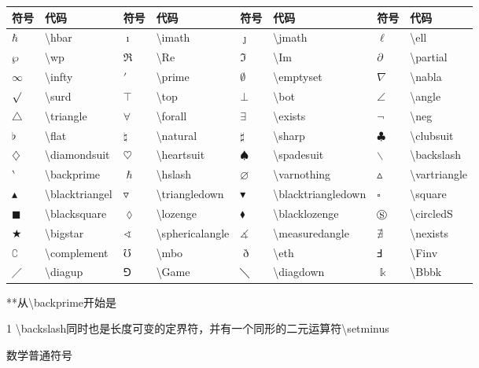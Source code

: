 \documentclass[UTF8,fontset=ubuntu]{ctexart}
\begin{document}
\begin{threeparttable}
\begin{tabular}{l l l l l l l l}
	\hline
	符号 & 代码 & 符号 & 代码 & 符号 & 代码 & 符号 & 代码\\
	\hline
	$\hbar$ & \textbackslash hbar & $\imath$ & \textbackslash imath & $\jmath$ & \textbackslash jmath & $\ell$ & \textbackslash ell\\
	$\wp$ & \textbackslash wp & $\Re$ & \textbackslash Re & $\Im$ & \textbackslash Im & $\partial$ & \textbackslash partial\\
	$\infty$ & \textbackslash infty & $\prime$ & \textbackslash prime & $\emptyset$ & \textbackslash emptyset & $\nabla$ & \textbackslash nabla\\
	$\surd$ & \textbackslash surd & $\top$ & \textbackslash top & $\bot$ & \textbackslash bot & $\angle$ & \textbackslash angle\\
	$\triangle$ & \textbackslash triangle & $\forall$ & \textbackslash forall & $\exists$ & \textbackslash exists & $\neg$ & \textbackslash neg\\
	$\flat$ & \textbackslash flat & $\natural$ & \textbackslash natural & $\sharp$ & \textbackslash sharp & $\clubsuit$ & \textbackslash clubsuit\\
	$\diamondsuit$ & \textbackslash diamondsuit & $\heartsuit$ & \textbackslash heartsuit & $\spadesuit$ & \textbackslash spadesuit & $\backslash$ & \textbackslash backslash\tnote{1}\\
	$\backprime$ & \textbackslash backprime & $\hslash$ & \textbackslash hslash & $\varnothing$ & \textbackslash varnothing & $\vartriangle$ & \textbackslash vartriangle\\
	$\blacktriangle$ & \textbackslash blacktriangel & $\triangledown$ & \textbackslash triangledown & $\blacktriangledown$ & \textbackslash blacktriangledown & $\square$ & \textbackslash square\\
	$\blacksquare$ & \textbackslash blacksquare & $\lozenge$ & \textbackslash lozenge & $\blacklozenge$ & \textbackslash blacklozenge & $\circledS$ & \textbackslash circledS\\
	$\bigstar$ & \textbackslash bigstar & $\sphericalangle$ & \textbackslash sphericalangle & $\measuredangle$ & \textbackslash measuredangle & $\nexists$ & \textbackslash nexists\\
	$\complement$ & \textbackslash complement & $\mho$ & \textbackslash mbo & $\eth$ & \textbackslash eth & $\Finv$ & \textbackslash Finv\\
	$\diagup$ & \textbackslash diagup & $\Game$ & \textbackslash Game & $\diagdown$ & \textbackslash diagdown & $\Bbbk$ & \textbackslash Bbbk\\
	\hline
\end{tabular}
**从\textbackslash backprime开始是
\begin{tablenotes}
	\item[1] \textbackslash backslash同时也是长度可变的定界符，并有一个同形的二元运算符\textbackslash setminus
\end{tablenotes}
\caption{数学普通符号}
\end{threeparttable}
\end{document}
